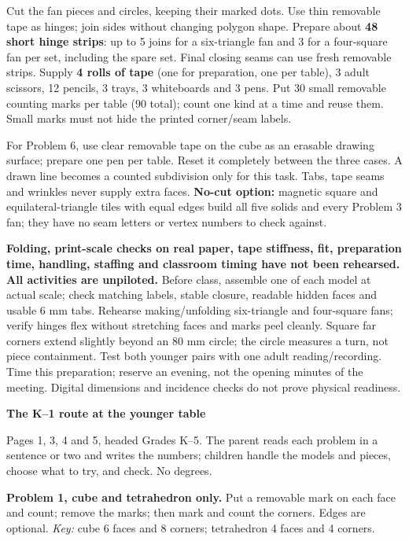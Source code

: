 \documentclass[11pt,letterpaper]{article}
\newcommand{\titleline}[1]{\par{\Large\bfseries #1}\par\vspace{4pt}}
\newcommand{\sub}[1]{\par\vspace{3pt}{\bfseries #1}\par}
\begin{document}
Cut the fan pieces and circles, keeping their marked dots. Use thin removable tape as hinges; join sides without changing polygon shape. Prepare about \textbf{48 short hinge strips}: up to 5 joins for a six-triangle fan and 3 for a four-square fan per set, including the spare set. Final closing seams can use fresh removable strips. Supply \textbf{4 rolls of tape} (one for preparation, one per table), 3 adult scissors, 12 pencils, 3 trays, 3 whiteboards and 3 pens. Put 30 small removable counting marks per table (90 total); count one kind at a time and reuse them. Small marks must not hide the printed corner/seam labels.

For Problem 6, use clear removable tape on the cube as an erasable drawing surface; prepare one pen per table. Reset it completely between the three cases. A drawn line becomes a counted subdivision only for this task. Tabs, tape seams and wrinkles never supply extra faces. \textbf{No-cut option:} magnetic square and equilateral-triangle tiles with equal edges build all five solids and every Problem 3 fan; they have no seam letters or vertex numbers to check against.

\sub{Physical checks still to perform}
\textbf{Folding, print-scale checks on real paper, tape stiffness, fit, preparation time, handling, staffing and classroom timing have not been rehearsed. All activities are unpiloted.} Before class, assemble one of each model at actual scale; check matching labels, stable closure, readable hidden faces and usable 6 mm tabs. Rehearse making/unfolding six-triangle and four-square fans; verify hinges flex without stretching faces and marks peel cleanly. Square far corners extend slightly beyond an 80 mm circle; the circle measures a turn, not piece containment. Test both younger pairs with one adult reading/recording. Time this preparation; reserve an evening, not the opening minutes of the meeting. Digital dimensions and incidence checks do not prove physical readiness.

\titleline{The K--1 route at the younger table}
Pages 1, 3, 4 and 5, headed Grades K--5. The parent reads each problem in a sentence or two and writes the numbers; children handle the models and pieces, choose what to try, and check. No degrees.

\textbf{Problem 1, cube and tetrahedron only.} Put a removable mark on each face and count; remove the marks; then mark and count the corners. Edges are optional. \emph{Key:} cube 6 faces and 8 corners; tetrahedron 4 faces and 4 corners.
\end{document}
